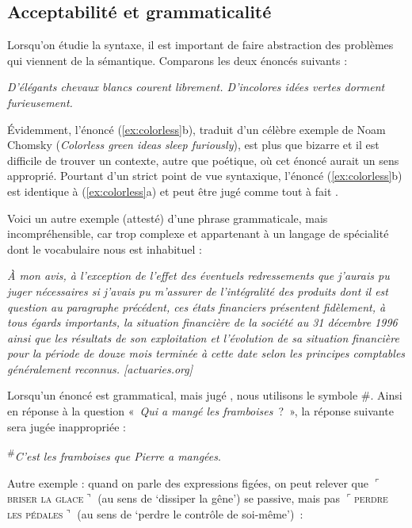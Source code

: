 \subsection{Acceptabilité et grammaticalité}

Lorsqu’on étudie la syntaxe, il est important de faire abstraction des problèmes qui viennent de la sémantique. Comparons les deux énoncés suivants :

\ea\label{ex:colorless}
\ea\itshape D’élégants chevaux blancs courent librement.
\ex\itshape D’incolores idées vertes dorment furieusement.
\z
\z

Évidemment, l’énoncé (\ref{ex:colorless}b), traduit d’un célèbre exemple de Noam Chomsky (\textit{Colorless green ideas sleep furiously}), est plus que bizarre et il est difficile de trouver un contexte, autre que poétique, où cet énoncé aurait un sens approprié. Pourtant d’un strict point de vue syntaxique, l’énoncé (\ref{ex:colorless}b) est identique à (\ref{ex:colorless}a) et peut être jugé comme tout à fait .

Voici un autre exemple (attesté) d’une phrase grammaticale, mais incompréhensible, car trop complexe et appartenant à un langage de spécialité dont le vocabulaire nous est inhabituel :

\ea\itshape
À mon avis, à l’exception de l’effet des éventuels redressements que j’aurais pu juger nécessaires si j’avais pu m’assurer de l’intégralité des produits dont il est question au paragraphe précédent, ces états financiers présentent fidèlement, à tous égards importants, la situation financière de la société au 31 décembre 1996 ainsi que les résultats de son exploitation et l’évolution de sa situation financière pour la période de douze mois terminée à cette date selon les principes comptables généralement reconnus. [actuaries.org]
\z

Lorsqu’un énoncé est grammatical, mais jugé , nous utilisons le symbole \#. Ainsi en réponse à la question «~\textit{Qui a mangé les framboises~}?~», la réponse suivante sera jugée inappropriée :

\ea
\textsuperscript{\#}{\itshape C’est les framboises que Pierre a mangées}.
\z

Autre exemple : quand on parle des expressions figées, on peut relever que $⌜$\textsc{briser} \textsc{la} \textsc{glace}$⌝$ (au sens de ‘dissiper la gêne’) se passive, mais pas $⌜$\textsc{perdre} \textsc{les} \textsc{pédales}$⌝$ (au sens de ‘perdre le contrôle de soi-même’)~:

